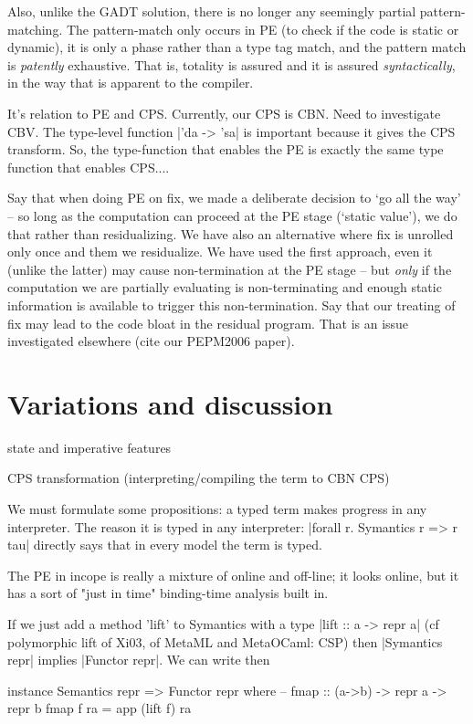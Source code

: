 \documentclass[preprint]{sigplanconf}
\begin{document}
Also, unlike the GADT
solution, there is no longer any seemingly partial
pattern-matching. The pattern-match only occurs in PE (to check if the
code is static or dynamic), it is only a phase rather than a type tag
match, and the pattern match is \emph{patently} exhaustive. That is,
totality is assured and it is assured \emph{syntactically}, in the way that
is apparent to the compiler.


It's relation to PE and CPS. Currently, our CPS is CBN. Need to
investigate CBV.
The type-level function |'da -> 'sa| is important because it gives 
the CPS transform. So, the type-function
that enables the PE is exactly the same type function that enables
CPS....


Say that when doing PE on fix, we made a deliberate decision to `go
all the way' -- so long as the computation can proceed at the PE stage
(`static value'), we do that rather than residualizing. We have also
an alternative where fix is unrolled only once and them we
residualize. We have used the first approach, even it (unlike the
latter) may cause non-termination at the PE stage -- but \emph{only} if the
computation we are partially evaluating is non-terminating and enough
static information is available to trigger this non-termination.
Say that our treating of fix may lead to the code bloat in the
residual program. That is an issue investigated elsewhere (cite our
PEPM2006 paper). 


\section{Variations and discussion}


state and imperative features

CPS transformation (interpreting/compiling the term to CBN CPS)

We must formulate some propositions: a typed term makes progress in
any interpreter. The reason it is typed in any interpreter:
|forall r. Symantics r => r tau| directly says that in every model the
term is typed. 

The PE in incope is really a mixture of online and off-line; it looks 
online, but it has a sort of "just in time" binding-time analysis built in.

If we just add a method 'lift' to Symantics with a type
|lift :: a -> repr a| (cf polymorphic lift of Xi03, of MetaML and
MetaOCaml: CSP)
then |Symantics repr| implies |Functor repr|. We can write then
\begin{code}
  instance Semantics repr => Functor repr where
  -- fmap :: (a->b) -> repr a -> repr b
  fmap f ra = app (lift f) ra
\end{code}
\end{document}
